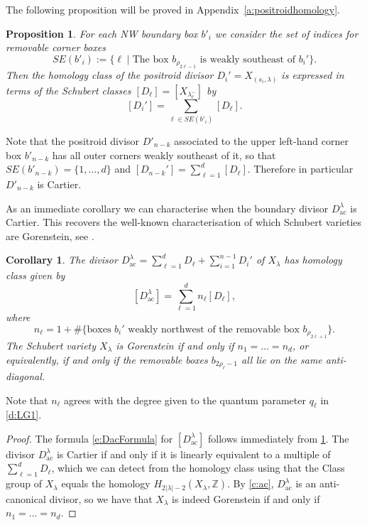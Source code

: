 \documentclass{amsart}
\newtheorem{cor}[thm]{Corollary}
\newtheorem{prop}[thm]{Proposition}
\theoremstyle{definition}
\numberwithin{equation}{section}
\newcommand{\Z}{\mathbb{Z}}
\newcommand{\Dac}{D_{\operatorname{ac}}}
\begin{document}
The following proposition will be proved in Appendix~\ref{a:positroidhomology}.

\begin{prop}\label{p:PositroidHomology} 
For each NW boundary box $b'_i$ 
	we consider the set of indices for removable corner boxes 
\[
SE(b'_i):=\{\ell\mid \text{The box $b_{\rho_{2\ell-1}}$ is 
	weakly southeast of $b_i'$}\}. 
\]
Then the homology class  
of the positroid divisor $D_i'=X_{(s_i,\lambda)}$ is expressed in terms of the Schubert classes $[D_\ell]=[X_{\lambda^-_\ell}]$ by
\[
[D_i']=\sum_{\ell\in SE(b'_i)} [D_\ell].
\]
\end{prop}

Note that the positroid divisor $D'_{n-k}$ associated to the upper left-hand corner box $b'_{n-k}$ has all outer corners {weakly} southeast of it, so that $SE(b'_{n-k})=\{1,\dots,d\}$ and $[D_{n-k}']=\sum_{\ell=1}^d [D_\ell]$.
Therefore in particular $D'_{n-k}$ is Cartier. 





As an immediate corollary we can  characterise when the 
boundary divisor $\Dac^\lambda$ is Cartier. This recovers the well-known characterisation of which Schubert varieties are Gorenstein, 
see \cite{WooYong,BrownLak:Schubert,Perrin:Schubert, Svanes}.
\begin{cor}\label{c:Gorenstein}
The divisor $\Dac^\lambda=\sum_{\ell=1}^d D_\ell+\sum_{i=1}^{n-1} D_i'$ of $X_\lambda$ has homology class given by
\begin{equation}\label{e:DacFormula}
[\Dac^\lambda]=\sum_{\ell=1}^d n_\ell[D_\ell],
\end{equation}
where 
	\begin{equation}\label{eq:nell}
n_\ell= 1+\#\{\text {boxes $b_i'$  weakly northwest of the removable box $b_{\rho_{2\ell+1}}$}\}.  
	\end{equation}
The Schubert variety $X_\lambda$ is Gorenstein if and only if $n_1=\dotsc=n_d$, or equivalently, if and only if the removable boxes $b_{2\rho_\ell-1}$ all lie on the same anti-diagonal. 
\end{cor} 

Note that $n_\ell$ agrees with the degree given to the quantum parameter $q_\ell$ in \cref{d:LG1}.

\begin{proof} The formula \eqref{e:DacFormula} for $[\Dac^\lambda]$ follows immediately from \cref{p:PositroidHomology}. The  divisor $\Dac^\lambda$ is Cartier if and only if it is linearly equivalent to a multiple of $\sum_{\ell=1}^d D_\ell$, which we can detect from the homology class using that the Class group of $X_\lambda$  equals the homology $H_{2|\lambda|-2}(X_\lambda,\Z)$. 
By \cref{c:ac},
	$\Dac^\lambda$ is an anti-canonical divisor, so  
	we have that $X_\lambda$ is indeed Gorenstein if and only if $n_1=\dotsc=n_d$.
\end{proof}
\end{document}
